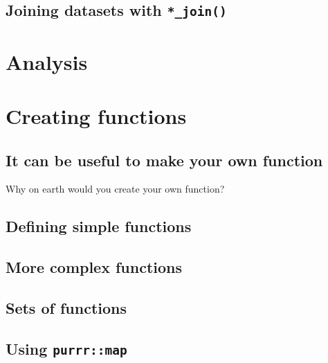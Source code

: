 \documentclass[]{book}
\begin{document}
\hypertarget{joining-datasets-with-_join}{%
\section{\texorpdfstring{Joining datasets with \texttt{*\_join()}}{Joining datasets with *\_join()}}\label{joining-datasets-with-_join}}

\hypertarget{analysis}{%
\chapter{Analysis}\label{analysis}}

\hypertarget{creating-functions}{%
\chapter{Creating functions}\label{creating-functions}}

\hypertarget{it-can-be-useful-to-make-your-own-function}{%
\section{It can be useful to make your own function}\label{it-can-be-useful-to-make-your-own-function}}

Why on earth would you create your own function?

\hypertarget{defining-simple-functions}{%
\section{Defining simple functions}\label{defining-simple-functions}}

\hypertarget{more-complex-functions}{%
\section{More complex functions}\label{more-complex-functions}}

\hypertarget{sets-of-functions}{%
\section{Sets of functions}\label{sets-of-functions}}

\hypertarget{using-purrrmap}{%
\section{\texorpdfstring{Using \texttt{purrr::map}}{Using purrr::map}}\label{using-purrrmap}}
\end{document}
